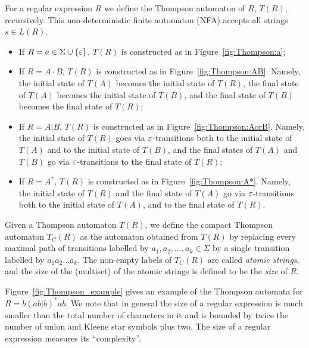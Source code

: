 \begin{definition}
For a regular expression $R$ we define the Thompson automaton of $R$, $T(R)$, recursively. This non-deterministic finite automaton (NFA) accepts all strings $s \in L(R)$.
\begin{itemize}
\item If  $R=a \in \Sigma\cup\{ \varepsilon \} $, $T(R)$ is constructed as in Figure~\ref{fig:Thompson:a};
\item If $R=A \cdot B $, $T(R)$ is constructed as in Figure~\ref{fig:Thompson:AB}. Namely, the initial state of $T(A)$ becomes the initial state of $T(R)$, the final state of $T(A)$ becomes the initial state of $T(B)$, and the final state of $T(B)$ becomes the final state of $T(R)$;
\item If $R=A | B$, $T(R)$ is constructed as in Figure~\ref{fig:Thompson:AorB}. Namely, the initial state of $T(R)$ goes via $\varepsilon$-transitions both to the initial state of $T(A)$ and to the initial state of $T(B)$, and the final states of $T(A)$ and $T(B)$ go via $\varepsilon$-transitions to the final state of $T(R)$;
\item If $R=A^*$, $T(R)$ is constructed as in Figure~\ref{fig:Thompson:A*}. Namely, the initial state of $T(R)$ and the final state of $T(A)$ go via $\varepsilon$-transitions both to the initial state of $T(A)$, and to the final state of $T(R)$. 
\end{itemize}
\end{definition}

\begin{definition}
Given a Thompson automaton $T(R)$, we define the compact Thompson automaton $T_C(R)$ as the automaton obtained from $T(R)$ by replacing every maximal path of transitions labelled by $a_1, a_2, \ldots, a_k \in \Sigma$ by a single transition labelled by $a_1 a_2 \ldots a_k$. The non-empty labels of $T_C(R)$ are called \emph{atomic strings}, and the size of the (multiset) of the atomic strings is defined to be the \emph{size} of $R$.
\end{definition}

Figure~\ref{fig:Thompson_example} gives an example of the Thompson automata for $R = b(ab|b)^*ab$. We note that in general the size of a regular expression is much smaller than the total number of characters in it and is bounded by twice the number of union and Kleene star symbols plus two. The size of a regular expression measures its ``complexity''.

